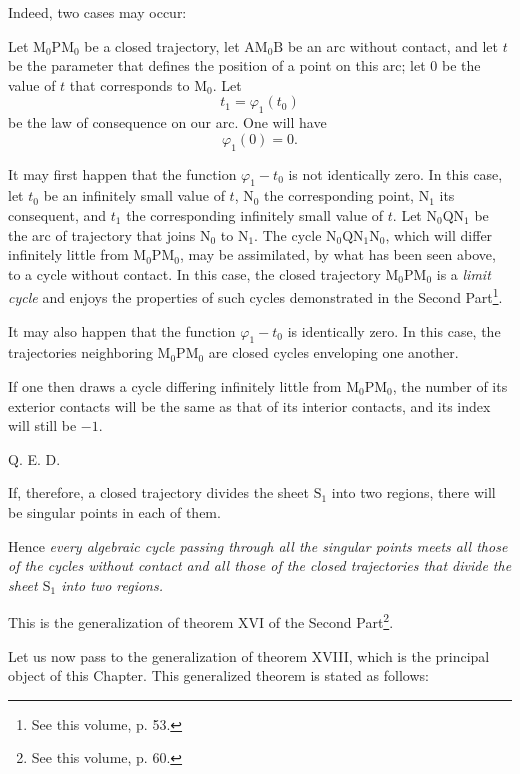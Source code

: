 \documentclass[11pt]{article}
\begin{document}
Indeed, two cases may occur:

Let $\mathrm{M}_0\mathrm{P}\mathrm{M}_0$ be a closed trajectory, let $\mathrm{A}\mathrm{M}_0\mathrm{B}$ be an arc without contact, and let $t$ be the parameter that defines the position of a point on this arc; let 0 be the value of $t$ that corresponds to $\mathrm{M}_0$. Let
\[
t_1=\varphi_1(t_0)
\]
be the law of consequence on our arc. One will have
\[
\varphi_1(0)=0.
\]

It may first happen that the function $\varphi_1-t_0$ is not identically zero. In this case, let $t_0$ be an infinitely small value of $t$, $\mathrm{N}_0$ the corresponding point, $\mathrm{N}_1$ its consequent, and $t_1$ the corresponding infinitely small value of $t$. Let $\mathrm{N}_0\mathrm{Q}\mathrm{N}_1$ be the arc of trajectory that joins $\mathrm{N}_0$ to $\mathrm{N}_1$. The cycle $\mathrm{N}_0\mathrm{Q}\mathrm{N}_1\mathrm{N}_0$, which will differ infinitely little from $\mathrm{M}_0\mathrm{P}\mathrm{M}_0$, may be assimilated, by what has been seen above, to a cycle without contact. In this case, the closed trajectory $\mathrm{M}_0\mathrm{P}\mathrm{M}_0$ is a \emph{limit cycle} and enjoys the properties of such cycles demonstrated in the Second Part\footnote{See this volume, p. 53.}.

It may also happen that the function $\varphi_1-t_0$ is identically zero. In this case, the trajectories neighboring $\mathrm{M}_0\mathrm{P}\mathrm{M}_0$ are closed cycles enveloping one another.

If one then draws a cycle differing infinitely little from $\mathrm{M}_0\mathrm{P}\mathrm{M}_0$, the number of its exterior contacts will be the same as that of its interior contacts, and its index will still be $-1$.
\begin{flushright}Q. E. D.\end{flushright}

If, therefore, a closed trajectory divides the sheet $\mathrm{S}_1$ into two regions, there will be singular points in each of them.

Hence \emph{every algebraic cycle passing through all the singular points meets all those of the cycles without contact and all those of the closed trajectories that divide the sheet $\mathrm{S}_1$ into two regions.}

This is the generalization of theorem XVI of the Second Part\footnote{See this volume, p. 60.}.

Let us now pass to the generalization of theorem XVIII, which is the principal object of this Chapter. This generalized theorem is stated as follows:
\end{document}
